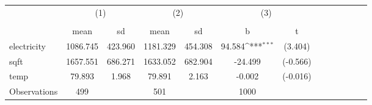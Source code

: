 {
\def\sym#1{\ifmmode^{#1}\else\(^{#1}\)\fi}
\begin{tabular}{l*{3}{cccc}}
\hline\hline
                    &\multicolumn{2}{c}{(1)}  &\multicolumn{2}{c}{(2)}  &\multicolumn{2}{c}{(3)}           \\
                    &\multicolumn{2}{c}{}     &\multicolumn{2}{c}{}     &\multicolumn{2}{c}{}              \\
                    &        mean&          sd&        mean&          sd&           b         &           t\\
\hline
electricity         &    1086.745&     423.960&    1181.329&     454.308&      94.584\sym{***}&     (3.404)\\
sqft                &    1657.551&     686.271&    1633.052&     682.904&     -24.499         &    (-0.566)\\
temp                &      79.893&       1.968&      79.891&       2.163&      -0.002         &    (-0.016)\\
\hline
Observations        &         499&            &         501&            &        1000         &            \\
\hline\hline
\end{tabular}
}
